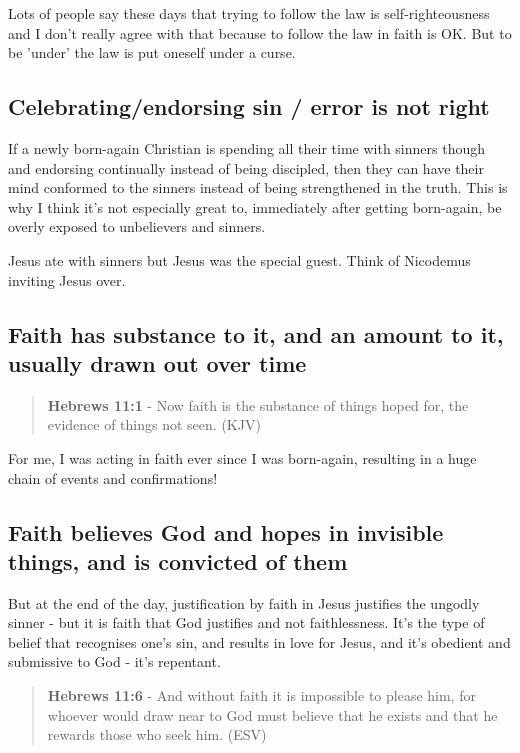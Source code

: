 \documentclass[11pt]{article}
\begin{document}
Lots of people say these days that trying to follow the law is self-righteousness and I don't really agree with that because to follow the law in faith is OK.
But to be 'under' the law is put oneself under a curse.

\subsection{Celebrating/endorsing sin / error is not right}
\label{sec:org25e9d0d}

If a newly born-again Christian is spending all their time with sinners though and endorsing continually instead of being discipled, then they can
have their mind conformed to the sinners instead of being strengthened in the truth. This is why I think it's not especially great to, immediately after getting born-again,
be overly exposed to unbelievers and sinners.

Jesus ate with sinners but Jesus was the special guest. Think of Nicodemus inviting Jesus over.

\subsection{Faith has substance to it, and an amount to it, usually drawn out over time}
\label{sec:orgac131fc}
\begin{quote}
\textbf{Hebrews 11:1} - Now faith is the substance of things hoped for, the evidence of things not seen. (KJV)
\end{quote}

For me, I was acting in faith ever since I was born-again, resulting in a huge chain of events and confirmations!

\subsection{Faith believes God and hopes in invisible things, and is convicted of them}
\label{sec:orgc3e541c}

But at the end of the day, justification by faith in Jesus justifies the ungodly sinner - but it is faith that God justifies and not faithlessness. It's the type of belief that recognises one's sin, and results in love for Jesus, and it's obedient and submissive to God - it's repentant.

\begin{quote}
\textbf{Hebrews 11:6} - And without faith it is impossible to please him, for whoever would draw near to God must believe that he exists and that he rewards those who seek him. (ESV)
\end{quote}
\end{document}
